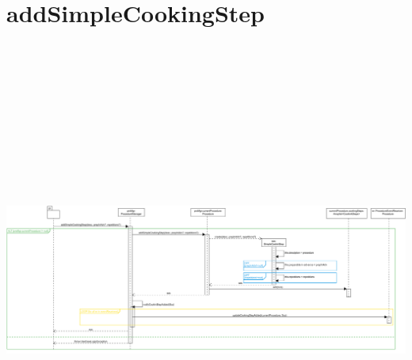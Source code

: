 \begingroup\centering
\renewcommand{\thesection}{2}
\section{addSimpleCookingStep}
\includegraphics[max width=\textwidth, max height=158mm]{../resources/img/GRP/DSD/op2.png}

